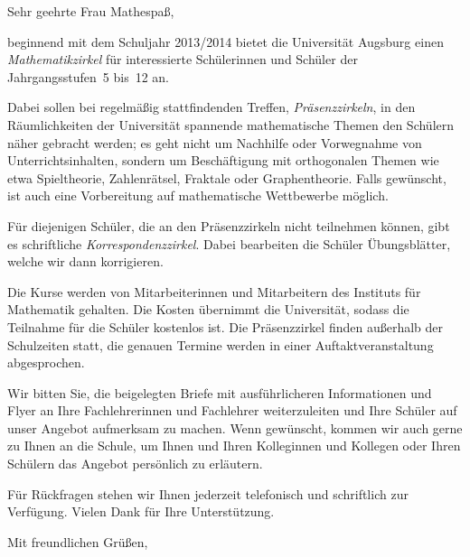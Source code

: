 \documentclass{zirkelbrief}
\begin{document}
\renewcommand{\anschrift}{%
      Holbein-Gymnasium Augsburg \\
      Fachbereich Mathematik \\
      Hallstraße 10 \\
      86150 Augsburg}
\renewcommand{\datum}{2.9.2013}
\renewcommand{\betreff}{Matheschülerzirkel der Universität Augsburg}

\makeletterhead

Sehr geehrte Frau Mathespaß,

beginnend mit dem Schuljahr 2013/2014 bietet die Universität Augsburg
einen \emph{Mathe\-matik\-zir\-kel} für interessierte Schülerinnen und Schüler der
Jahrgangsstufen~5 bis~12 an.

Dabei sollen bei regelmäßig stattfindenden Treffen, \emph{Präsenzzirkeln}, in
den Räum\-lich\-kei\-ten der Universität spannende mathematische Themen den Schülern
näher gebracht werden; es geht nicht um Nachhilfe oder Vorwegnahme von
Unterrichtsinhalten, sondern um Beschäftigung mit orthogonalen Themen wie etwa
Spieltheorie, Zahlenrätsel, Fraktale oder Graphentheorie. Falls gewünscht, ist
auch eine Vorbereitung auf mathematische Wettbewerbe möglich.

Für diejenigen Schüler, die an den Präsenzzirkeln nicht teilnehmen können, gibt
es schriftliche \emph{Korrespondenzzirkel}. Dabei bearbeiten die Schüler
Übungsblätter, welche wir dann korrigieren.

Die Kurse werden von Mitarbeiterinnen und Mitarbeitern des
Instituts für Mathematik gehalten. Die Kosten übernimmt die Universität, sodass
die Teilnahme für die Schüler kostenlos ist. Die Präsenzzirkel finden
außerhalb der Schulzeiten statt, die genauen Termine werden in einer
Auftaktveranstaltung abgesprochen.

Wir bitten Sie, die beigelegten Briefe mit ausführlicheren Informationen und Flyer an Ihre
Fachlehrerinnen und Fachlehrer weiterzuleiten und Ihre Schüler auf unser
Angebot aufmerksam zu machen. Wenn gewünscht, kommen wir auch gerne zu Ihnen an die
Schule, um Ihnen und Ihren Kolleginnen und Kollegen oder Ihren Schülern das
Angebot persönlich zu erläutern.

Für Rückfragen stehen wir Ihnen jederzeit telefonisch und schriftlich zur
Verfügung. Vielen Dank für Ihre Unterstützung.

Mit freundlichen Grüßen,
\end{document}
